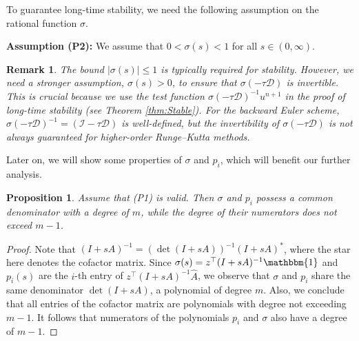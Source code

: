 \documentclass[a4paper, oneside]{book}
\def\bbone{{\mathbbm{1}}}
\def\hatA{{\hat{A}}}
\newtheorem{remark}{Remark}[section]
\newtheorem{proposition}{Proposition}[section]
\begin{document}
To guarantee long-time stability, we need the following assumption on the rational function $\sigma$.\vskip5pt

\noindent \textbf{Assumption (P2):} We assume that $0 < \sigma(s) < 1$ for all $s\in(0,\infty)$.

\begin{remark}\label{rem:P2} 
The bound $|\sigma(s)| \le 1$ is typically required for stability. However, we need a stronger assumption, $\sigma(s) > 0$, to ensure that $\sigma(-\tau \mathcal{D})$ is invertible. This is crucial because we use the test function $\sigma(-\tau \mathcal{D})^{-1} u^{n+1}$ in the proof of long-time stability (see Theorem \ref{thm:Stable}). For the backward Euler scheme, $\sigma(-\tau \mathcal{D})^{-1} = (\mathcal{I} - \tau \mathcal{D})$ is well-defined, but the invertibility of $\sigma(-\tau \mathcal{D})$ is not always guaranteed for higher-order Runge--Kutta methods.
\end{remark}

Later on, we will show some properties of $\sigma$ and $p_i$, which will benefit our further analysis. 

\begin{proposition}\label{thm:Polynomial}
Assume that (P1) is valid. Then $\sigma$ and $p_i$ possess a common denominator with a degree of $m$, while the degree of their numerators does not exceed $m-1$.
\end{proposition}

\begin{proof}
Note that $(I+sA)^{-1} = (\det(I+sA))^{-1}(I+sA)^*$, where the star here denotes the cofactor matrix.
Since $\sigma(s) = z^\top(I + sA)^{-1}\bbone$ and 
$p_i(s)$ are the $i$-th entry of $z^\top(I + sA)^{-1}\hatA$,
we observe that $\sigma$ and $p_i$ share the same denominator $\det(I+sA)$, a polynomial of degree $m$.
Also, we conclude that all entries of the cofactor matrix are polynomials with degree not exceeding $m-1$.
It follows that numerators of the polynomials 
$p_i$ and $\sigma$ also have a degree of $m-1$. 
\end{proof}
\end{document}
